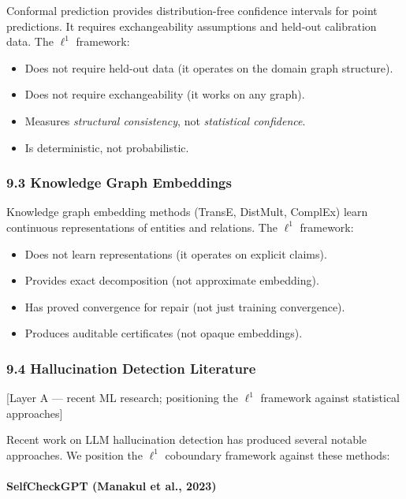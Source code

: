 \documentclass[
]{article}
\providecommand{\tightlist}{%
  \setlength{\itemsep}{0pt}\setlength{\parskip}{0pt}}
\begin{document}
Conformal prediction provides distribution-free confidence intervals for
point predictions. It requires exchangeability assumptions and held-out
calibration data. The \(\ell^1\) framework:

\begin{itemize}
\tightlist
\item
  Does not require held-out data (it operates on the domain graph
  structure).
\item
  Does not require exchangeability (it works on any graph).
\item
  Measures \emph{structural consistency}, not \emph{statistical
  confidence}.
\item
  Is deterministic, not probabilistic.
\end{itemize}

\subsubsection{9.3 Knowledge Graph
Embeddings}\label{knowledge-graph-embeddings}

Knowledge graph embedding methods (TransE, DistMult, ComplEx) learn
continuous representations of entities and relations. The \(\ell^1\)
framework:

\begin{itemize}
\tightlist
\item
  Does not learn representations (it operates on explicit claims).
\item
  Provides exact decomposition (not approximate embedding).
\item
  Has proved convergence for repair (not just training convergence).
\item
  Produces auditable certificates (not opaque embeddings).
\end{itemize}

\subsubsection{9.4 Hallucination Detection
Literature}\label{hallucination-detection-literature}

{[}Layer A --- recent ML research; positioning the \(\ell^1\) framework
against statistical approaches{]}

Recent work on LLM hallucination detection has produced several notable
approaches. We position the \(\ell^1\) coboundary framework against
these methods:

\paragraph{SelfCheckGPT (Manakul et al.,
2023)}\label{selfcheckgpt-manakul-et-al.-2023}
\end{document}
